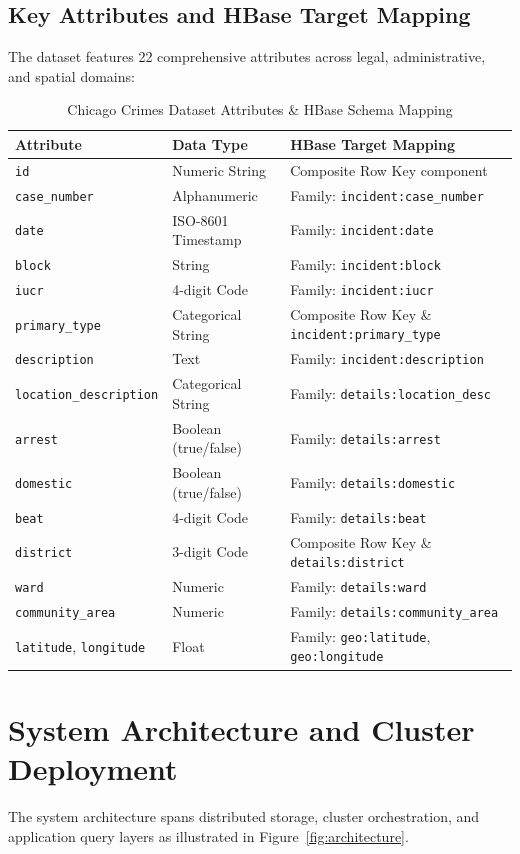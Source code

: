 \documentclass[12pt, a4paper]{article}
\begin{document}
\subsection{Key Attributes and HBase Target Mapping}
The dataset features 22 comprehensive attributes across legal, administrative, and spatial domains:
\begin{table}[H]
\centering
\small
\caption{Chicago Crimes Dataset Attributes \& HBase Schema Mapping}
\begin{tabular}{p{3.2cm}p{3.0cm}p{7.5cm}}
\toprule
\textbf{Attribute} & \textbf{Data Type} & \textbf{HBase Target Mapping} \\
\midrule
\texttt{id} & Numeric String & Composite Row Key component \\
\texttt{case\_number} & Alphanumeric & Family: \texttt{incident:case\_number} \\
\texttt{date} & ISO-8601 Timestamp & Family: \texttt{incident:date} \\
\texttt{block} & String & Family: \texttt{incident:block} \\
\texttt{iucr} & 4-digit Code & Family: \texttt{incident:iucr} \\
\texttt{primary\_type} & Categorical String & Composite Row Key \& \texttt{incident:primary\_type} \\
\texttt{description} & Text & Family: \texttt{incident:description} \\
\texttt{location\_description} & Categorical String & Family: \texttt{details:location\_desc} \\
\texttt{arrest} & Boolean (true/false) & Family: \texttt{details:arrest} \\
\texttt{domestic} & Boolean (true/false) & Family: \texttt{details:domestic} \\
\texttt{beat} & 4-digit Code & Family: \texttt{details:beat} \\
\texttt{district} & 3-digit Code & Composite Row Key \& \texttt{details:district} \\
\texttt{ward} & Numeric & Family: \texttt{details:ward} \\
\texttt{community\_area} & Numeric & Family: \texttt{details:community\_area} \\
\texttt{latitude}, \texttt{longitude} & Float & Family: \texttt{geo:latitude}, \texttt{geo:longitude} \\
\bottomrule
\end{tabular}
\end{table}

\section{System Architecture and Cluster Deployment}
The system architecture spans distributed storage, cluster orchestration, and application query layers as illustrated in Figure~\ref{fig:architecture}.
\end{document}
